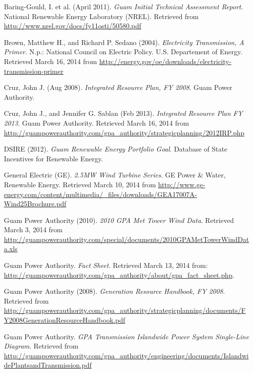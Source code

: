\documentclass[12pt,letterpaper,fleqn]{article}
\begin{document}
\begin{thebibliography}{99}

  Baring-Gould, I. et al. (April 2011).
  \emph{Guam Initial Technical Assessment Report}.
  National Renewable Energy Laboratory (NREL).
  Retrieved from \url{http://www.nrel.gov/docs/fy11osti/50580.pdf}
  
  Brown, Matthew H., and Richard P. Sedano (2004).
  \emph{Electricity Transmission, A Primer}.
  N.p.: National Council on Electric Policy.
  U.S. Departement of Energy.
  Retrieved March 16, 2014 from
  \url{http://energy.gov/oe/downloads/electricity-transmission-primer}

  Cruz, John J. (Aug 2008).
  \emph{Integrated Resource Plan, FY 2008}.
  Guam Power Authority.

  Cruz, John J., and Jennifer G. Sablan (Feb 2013).
  \emph{Integrated Resource Plan FY 2013}.
  Guam Power Authority.
  Retrieved March 16, 2014 from
  \url{http://guampowerauthority.com/gpa_authority/strategicplanning/2012IRP.php}

  DSIRE (2012).
  \emph{Guam Renewable Energy Portfolio Goal}.
  Database of State Incentives for Renewable Energy.
  
  General Electric (GE).
  \emph{2.5MW Wind Turbine Series}.
  GE Power \& Water, Renewable Energy.
  Retrieved March 10, 2014 from
  \url{http://www.ge-energy.com/content/multimedia/_files/downloads/GEA17007A-Wind25Brochure.pdf}

  Guam Power Authority (2010).
  \emph{2010 GPA Met Tower Wind Data}.
  Retrieved March 3, 2014 from
  \url{http://guampowerauthority.com/special/documents/2010GPAMetTowerWindData.xls}

  Guam Power Authority.
  \emph{Fact Sheet}.
  Retrieved March 13, 2014 from: 
  \url{http://guampowerauthority.com/gpa_authority/about/gpa_fact_sheet.php}.

  Guam Power Authority (2008).
  \emph{Generation Resource Handbook, FY 2008}.
  Retrieved from
  \url{http://guampowerauthority.com/gpa_authority/strategicplanning/documents/FY2008GenerationResourceHandbook.pdf}

  Guam Power Authority.
  \emph{GPA Transmission Islandwide Power System Single-Line Diagram}.
  Retrieved from 
  \url{http://guampowerauthority.com/gpa_authority/engineering/documents/IslandwidePlantsandTransmission.pdf}


\end{thebibliography}
\end{document}
